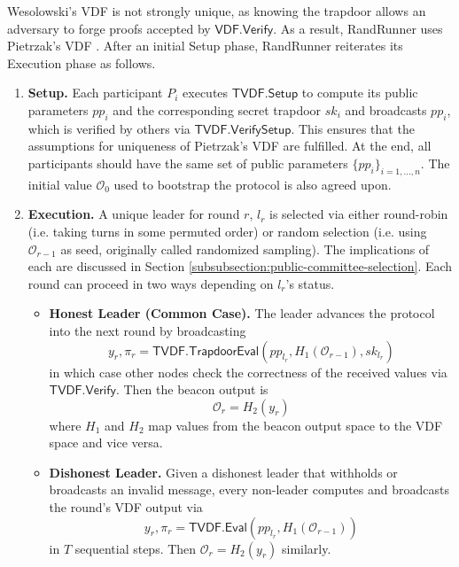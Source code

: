\documentclass[conference]{IEEEtran}
\theoremstyle{definition}
\theoremstyle{remark}
\begin{document}
Wesolowski's VDF \cite{wesolowski2019efficient} is not strongly unique, as knowing the trapdoor allows an adversary to forge proofs accepted by $\mathsf{VDF.Verify}$. As a result, RandRunner uses Pietrzak's VDF \cite{pietrzak2018simple}. After an initial Setup phase, RandRunner reiterates its Execution phase as follows.
\begin{enumerate}
    \item \textbf{Setup.} Each participant $P_i$ executes $\mathsf{TVDF.Setup}$ to compute its public parameters $pp_i$ and the corresponding secret trapdoor $sk_i$ and broadcasts $pp_i$, which is verified by others via $\mathsf{TVDF.VerifySetup}$. This ensures that the assumptions for uniqueness of Pietrzak's VDF are fulfilled. At the end, all participants should have the same set of public parameters $\{pp_i\}_{i = 1, ..., n}$. The initial value $\mathcal{O}_0$ used to bootstrap the protocol is also agreed upon.
    \item \textbf{Execution.} A unique leader for round $r$, $l_r$ is selected via either round-robin (i.e. taking turns in some permuted order) or random selection (i.e. using $\mathcal{O}_{r - 1}$ as seed, originally called randomized sampling). The implications of each are discussed in Section \ref{subsubsection:public-committee-selection}. Each round can proceed in two ways depending on $l_r$'s status.
    \begin{itemize}
        \item \textbf{Honest Leader (Common Case).} The leader advances the protocol into the next round by broadcasting
        $$y_r, \pi_r = \mathsf{TVDF.TrapdoorEval}(pp_{l_r}, H_1(\mathcal{O}_{r - 1}), sk_{l_r})$$
        in which case other nodes check the correctness of the received values via $\mathsf{TVDF.Verify}$. Then the beacon output is
        $$\mathcal{O}_r = H_2(y_r)$$
        where $H_1$ and $H_2$ map values from the beacon output space to the VDF space and vice versa.
        \item \textbf{Dishonest Leader.} Given a dishonest leader that withholds or broadcasts an invalid message, every non-leader computes and broadcasts the round's VDF output via
        $$y_r, \pi_r = \mathsf{TVDF.Eval}(pp_{l_r}, H_1(\mathcal{O}_{r - 1}))$$
        in $T$ sequential steps. Then $\mathcal{O}_r = H_2(y_r)$ similarly.
    \end{itemize}
\end{enumerate}
\end{document}
